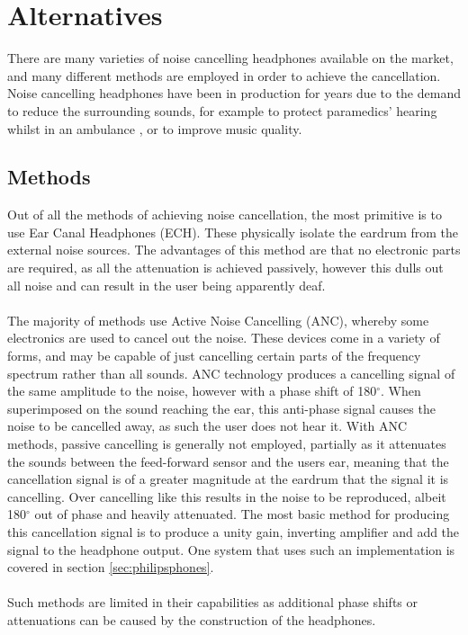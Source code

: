 \section{Alternatives}

There are many varieties of noise cancelling headphones available on the market, and many different methods are employed in order to achieve the cancellation.
Noise cancelling headphones have been in production for years due to the demand to reduce the surrounding sounds, for example to protect paramedics' hearing whilst in an ambulance \cite{EMHeadsets}, or to improve music quality.

\subsection{Methods}
Out of all the methods of achieving noise cancellation, the most primitive is to use Ear Canal Headphones (ECH).
These physically isolate the eardrum from the external noise sources.
The advantages of this method are that no electronic parts are required, as all the attenuation is achieved passively, however this dulls out all noise and can result in the user being apparently deaf.
\\
\\
The majority of methods use Active Noise Cancelling (ANC), whereby some electronics are used to cancel out the noise.
These devices come in a variety of forms, and may be capable of just cancelling certain parts of the frequency spectrum rather than all sounds.
ANC technology produces a cancelling signal of the same amplitude to the noise, however with a phase shift of 180$^{\circ}$.
When superimposed on the sound reaching the ear, this anti-phase signal causes the noise to be cancelled away, as such the user does not hear it.
With ANC methods, passive cancelling is generally not employed, partially as it attenuates the sounds between the feed-forward sensor and the users ear, meaning that the cancellation signal is of a greater magnitude at the eardrum that the signal it is cancelling.
Over cancelling like this results in the noise to be reproduced, albeit 180$^{\circ}$ out of phase and heavily attenuated.
The most basic method for producing this cancellation signal is to produce a unity gain, inverting amplifier and add the signal to the headphone output.
One system that uses such an implementation is covered in section \ref{sec:philipsphones}.
\\
\\
Such methods are limited in their capabilities as additional phase shifts or attenuations can be caused by the construction of the headphones.
